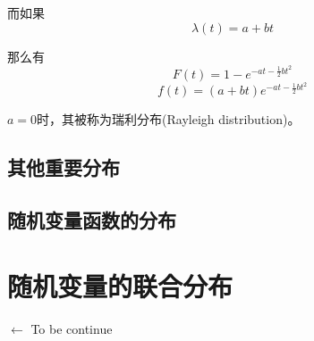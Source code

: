 \documentclass[UTF8]{ctexart}
\begin{document}
而如果
$$\lambda (t)=a+bt $$

那么有
$$F(t)=1-e^{-at-\frac{1}{2}bt^{2}} $$
$$f(t)=(a+bt)e^{-at-\frac{1}{2}bt^{2}} $$

$a=0$时，其被称为瑞利分布(Rayleigh distribution)。

\subsection{其他重要分布}

\subsection{随机变量函数的分布}

\section{随机变量的联合分布}



$\gets$ To be continue
\end{document}
